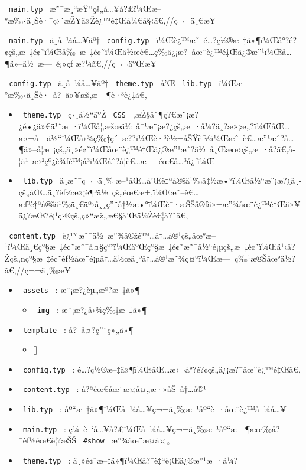 \texttt{\ main.typ\ }
æ˜¯æ¸²æŸ``çš„å\ldots¥å?£ï¼Œæ--°æ‰‹ä¸Šè·¯ç›´æŽ¥ä»Žè¿™é‡Œå¼€å§‹ã€‚//ç¬¬ä¸€æ­¥

\texttt{\ main.typ\ } ä¸­å¯¼å\ldots¥äº† \texttt{\ config.typ\ }
ï¼Œè¿™æ˜¯é\ldots?ç½®æ--‡ä»¶ï¼Œå°?é?¢çš„æ~‡é¢˜ï¼Œå‰¯æ~‡é¢˜ï¼Œä½œè€\ldots ç­‰ä¿¡æ?¯åœ¨è¿™é‡Œä¿®æ''¹ï¼Œå\ldots¶ä»--ä½~æ---~é¡»çƒ¦æ?¼ã€‚//ç¬¬äºŒæ­¥

\texttt{\ config.typ\ } ä¸­å¯¼å\ldots¥äº† \texttt{\ theme.typ\ } å'Œ
\texttt{\ lib.typ\ } ï¼Œæ--°æ‰‹ä¸Šè·¯å?¯ä»¥æš‚æ---¶è·³è¿‡ã€‚

\begin{itemize}
\tightlist
\item
  \texttt{\ theme.typ\ } ç›¸å½``äºŽ \texttt{\ CSS\ }
  ,æŽ§åˆ¶ç?€æ¨¡æ?¿é•¿ä»€ä¹ˆæ~·ï¼Œå¦‚æžœä½~å¯¹æ¨¡æ?¿çš„æ~·å¼?ä¸?æ»¡æ„?ï¼ŒåŒ\ldots æ‹¬å­---ä½``ï¼Œå›¾ç‰‡ç´~æ??ï¼Œè·³è½¬åŠŸèƒ½ï¼Œæˆ--è€\ldots æ''¹æˆ?å\ldots¶ä»--å­¦æ~¡çš„ä¸»é¢˜ï¼Œåœ¨è¿™é‡Œä¿®æ''¹æˆ?ä½~å¸Œæœ›çš„æ~·å­?ã€‚å­¦ä¹~æ›²çº¿è¾ƒé™¡å³­ï¼Œåˆ?å­¦è€\ldots æ---~éœ€å\ldots³å¿ƒï¼Œ
\item
  \texttt{\ lib.typ\ }
  ä¸­æ˜¯ç¬¬ä¸‰æ--¹åŒ\ldots å'Œè‡ªå®šä¹‰å‡½æ•°ï¼Œå½``æ¨¡æ?¿ä¸­çš„åŒ\ldots ä¸?èƒ½æ»¡è¶³ä½~çš„éœ€æ±‚ï¼Œæˆ--è€\ldots æƒ³è‡ªå®šä¹‰ä¸€äº›å¸¸ç''¨å‡½æ•°ï¼Œè¯·æŠŠå®ƒä»¬æ''¾åœ¨è¿™é‡Œä»¥ä¿?æŒ?é¡¹ç›®çš„ç»``æž„æ€§å'Œä½Žè€¦å?ˆã€‚
\end{itemize}

\texttt{\ content.typ\ }
è¿™æ˜¯ä½~æ''¾å®žé™\ldots å†\ldots å®¹çš„åœ°æ--¹ï¼Œä¸€çº§æ~‡é¢˜æ˜¯å¤§çº²ï¼ŒäºŒçº§æ~‡é¢˜æ˜¯å½``é¡µçš„æ~‡é¢˜ï¼Œä¹‹å?Žçš„nçº§æ~‡é¢˜éƒ½åœ¨é¡µå†\ldots ä½œä¸ºå†\ldots å®¹æ˜¾ç¤ºï¼Œæ---~ç‰¹æ®Šåœ°ä½?ã€‚//ç¬¬ä¸‰æ­¥

\begin{itemize}
\item
  \texttt{\ assets\ } : æ¨¡æ?¿èµ„æº?æ--‡ä»¶

  \begin{itemize}
  \tightlist
  \item
    \texttt{\ img\ } : æ¨¡æ?¿å›¾ç‰‡æ--‡ä»¶
  \end{itemize}
\item
  \texttt{\ template\ } : å?¯å¤?ç''¨ç»„ä»¶

  \begin{itemize}
  \tightlist
  \item
    {[}{]}
  \end{itemize}
\item
  \texttt{\ config.typ\ } :
  é\ldots?ç½®æ--‡ä»¶ï¼ŒåŒ\ldots æ‹¬å°?é?¢çš„ä¿¡æ?¯åœ¨è¿™é‡Œã€‚
\item
  \texttt{\ content.typ\ } : å?ªéœ€åœ¨æ­¤å¤„æ·»åŠ~å†\ldots å®¹
\item
  \texttt{\ lib.typ\ } :
  åº``æ--‡ä»¶ï¼Œå¯¼å\ldots¥ç¬¬ä¸‰æ--¹åº``è¯·åœ¨è¿™å¯¼å\ldots¥
\item
  \texttt{\ main.typ\ } :
  ç¼--è¯`å\ldots¥å?£ï¼Œå¯¼å\ldots¥ç¬¬ä¸‰æ--¹åº``æ---¶æœ‰å?¯èƒ½éœ€è¦?æŠŠ
  \texttt{\ \#show\ } æ''¾åœ¨æ­¤å¤„
\item
  \texttt{\ theme.typ\ } : ä¸»é¢˜æ--‡ä»¶ï¼Œå?¯è‡ªè¡Œä¿®æ''¹æ~·å¼?
\end{itemize}

